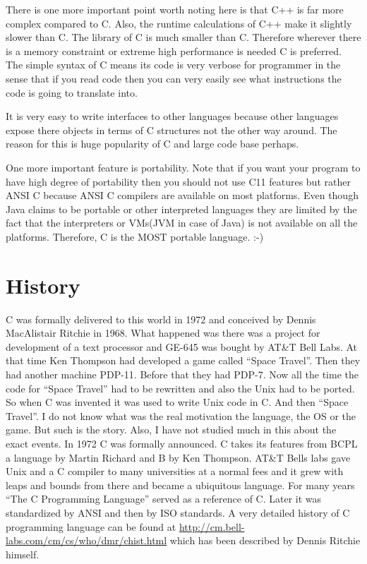There is one more important point worth noting here is that C++ is far more
complex compared to C. Also, the runtime calculations of C++ make it slightly
slower than C. The library of C is much smaller than C. Therefore wherever
there is a memory constraint or extreme high performance is needed C is
preferred. The simple syntax of C means its code is very verbose for programmer
in the sense that if you read code then you can very easily see what
instructions the code is going to translate into.

It is very easy to write interfaces to other languages because other languages
expose there objects in terms of C structures not the other way around. The
reason for this is huge popularity of C and large code base perhaps.

One more important feature is portability. Note that if you want your program
to have high degree of portability then you should not use C11 features but
rather ANSI C because ANSI C compilers are available on most platforms. Even
though Java claims to be portable or other interpreted languages they are
limited by the fact that the interpreters or VMs(JVM in case of Java) is not
available on all the platforms. Therefore, C is the MOST portable language. :-)

\section{History}
C was formally delivered to this world in 1972 and conceived by Dennis
MacAlistair Ritchie in 1968. What happened was there was a project for
development of a text processor and GE-645 was bought by AT\&T Bell Labs. At
that time Ken Thompson had developed a game called ``Space Travel''. Then they
had another machine PDP-11. Before that they had PDP-7. Now all the time the
code for ``Space Travel'' had to be rewritten and also the Unix had to be
ported. So when C was invented it was used to write Unix code in C. And then
``Space Travel''. I do not know what was the real motivation the language, the
OS or the game. But such is the story. Also, I have not studied much in this 
about the exact events. In 1972 C was formally announced. C takes its features
from BCPL a language by Martin Richard and B by Ken Thompson. AT\&T Bells labs
gave Unix and a C compiler to many universities at a normal fees and it grew
with leaps and bounds from there and became a ubiquitous language. For many
years ``The C Programming Language'' served as a reference of C. Later it was
standardized by ANSI and then by ISO standards. A very detailed history of C
programming language can be found at
\url{http://cm.bell-labs.com/cm/cs/who/dmr/chist.html} which has been described
by Dennis Ritchie himself.

